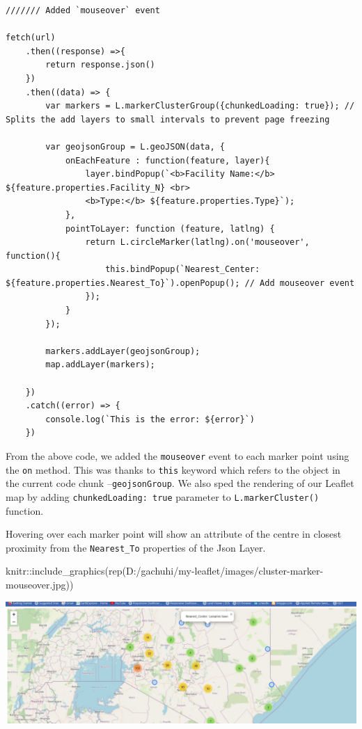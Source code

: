 \documentclass[
]{book}
\newenvironment{Shaded}{\begin{snugshade}}{\end{snugshade}}
\newcommand{\FunctionTok}[1]{\textcolor[rgb]{0.00,0.00,0.00}{#1}}
\newcommand{\NormalTok}[1]{#1}
\newcommand{\SpecialCharTok}[1]{\textcolor[rgb]{0.00,0.00,0.00}{#1}}
\newcommand{\StringTok}[1]{\textcolor[rgb]{0.31,0.60,0.02}{#1}}
\begin{document}
\begin{verbatim}
/////// Added `mouseover` event

fetch(url)
    .then((response) =>{
        return response.json()
    })
    .then((data) => {
        var markers = L.markerClusterGroup({chunkedLoading: true}); // Splits the add layers to small intervals to prevent page freezing

        var geojsonGroup = L.geoJSON(data, {
            onEachFeature : function(feature, layer){
                layer.bindPopup(`<b>Facility Name:</b> ${feature.properties.Facility_N} <br>
                <b>Type:</b> ${feature.properties.Type}`);
            },
            pointToLayer: function (feature, latlng) {
                return L.circleMarker(latlng).on('mouseover', function(){
                    this.bindPopup(`Nearest_Center: ${feature.properties.Nearest_To}`).openPopup(); // Add mouseover event
                });
            }
        });

        markers.addLayer(geojsonGroup);
        map.addLayer(markers);

    })
    .catch((error) => {
        console.log(`This is the error: ${error}`)
    })
\end{verbatim}

From the above code, we added the \texttt{mouseover} event to each marker point using the \texttt{on} method. This was thanks to \texttt{this} keyword which refers to the object in the current code chunk --\texttt{geojsonGroup}. We also sped the rendering of our Leaflet map by adding \texttt{chunkedLoading:\ true} parameter to \texttt{L.markerCluster()} function.

Hovering over each marker point will show an attribute of the centre in closest proximity from the \texttt{Nearest\_To} properties of the Json Layer.

\begin{Shaded}
\begin{Highlighting}[]
\NormalTok{knitr}\SpecialCharTok{::}\FunctionTok{include\_graphics}\NormalTok{(}\FunctionTok{rep}\NormalTok{(}\StringTok{\textquotesingle{}D:/gachuhi/my{-}leaflet/images/cluster{-}marker{-}mouseover.jpg\textquotesingle{}}\NormalTok{))}
\end{Highlighting}
\end{Shaded}

\includegraphics[width=26.22in]{../images/cluster-marker-mouseover}
\end{document}
